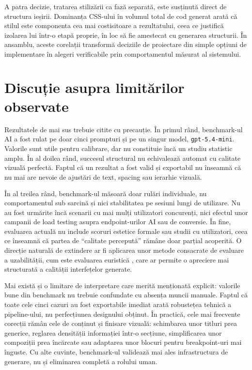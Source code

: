 A patra decizie, tratarea stilizării ca fază separată, este susținută direct de structura ieșirii. Dominanța CSS-ului în volumul total de cod generat arată că stilul este componenta cea mai costisitoare a rezultatului, ceea ce justifică izolarea lui într-o etapă proprie, în loc să fie amestecat cu generarea structurii. În ansamblu, aceste corelații transformă deciziile de proiectare din simple opțiuni de implementare în alegeri verificabile prin comportamentul măsurat al sistemului.

\section{Discuție asupra limitărilor observate}

Rezultatele de mai sus trebuie citite cu precauție. În primul rând, benchmark-ul AI a fost rulat pe doar cinci prompturi și pe un singur model, \texttt{gpt-5.4-mini}. Valorile sunt utile pentru calibrare, dar nu constituie încă un studiu statistic amplu. În al doilea rând, succesul structural nu echivalează automat cu calitate vizuală perfectă. Faptul că un rezultat a fost valid și exportabil nu înseamnă că nu mai are nevoie de ajustări de text, spacing sau ierarhie vizuală.

În al treilea rând, benchmark-ul măsoară doar rulări individuale, nu comportamentul sub sarcină și nici stabilitatea pe sesiuni lungi de utilizare. Nu au fost urmărite încă scenarii cu mai mulți utilizatori concurenți, nici efectul unor campanii de load testing asupra endpoint-urilor AI sau de conversie. În fine, evaluarea actuală nu include scoruri estetice formale sau studii cu utilizatori, ceea ce înseamnă că partea de ``calitate percepută'' rămâne doar parțial acoperită. O direcție naturală de extindere ar fi aplicarea unor metode consacrate de evaluare a uzabilității, cum este evaluarea euristică \cite{nielsen1990heuristic}, care ar permite o apreciere mai structurată a calității interfețelor generate.

Mai există și o limitare de interpretare care merită menționată explicit: valorile bune din benchmark nu trebuie confundate cu absența muncii manuale. Faptul că toate cele cinci cazuri au fost exportabile imediat arată robustețea tehnică a pipeline-ului, nu perfecțiunea designului obținut. În practică, cele mai frecvente corecții rămân cele de conținut și finisare vizuală: schimbarea unor titluri prea generice, reglarea densității informației într-o secțiune, simplificarea unor compoziții prea încărcate sau adaptarea unor blocuri pentru breakpoint-uri mai înguste. Cu alte cuvinte, benchmark-ul validează mai ales infrastructura de generare, nu și eliminarea completă a rolului uman.

